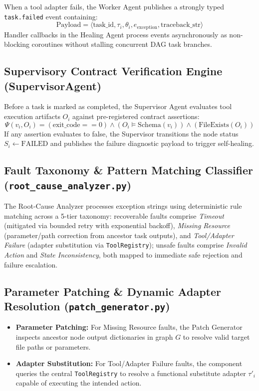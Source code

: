\documentclass[conference]{IEEEtran}
\newcommand{\chg}[1]{{\color{blue}#1}}
\begin{document}
When a tool adapter fails, the Worker Agent publishes a strongly typed \texttt{task.failed} event containing:
\begin{equation}
\text{Payload} = \langle \text{task\_id}, \tau_i, \theta_i, e_{\text{exception}}, \text{traceback\_str} \rangle
\end{equation}
Handler callbacks in the Healing Agent process events asynchronously as non-blocking coroutines without stalling concurrent DAG task branches.

\subsection{Supervisory Contract Verification Engine (SupervisorAgent)}
Before a task is marked as completed, the Supervisor Agent evaluates tool execution artifacts $O_i$ against pre-registered contract assertions:
\begin{equation}
\Psi(v_i, O_i) = (\text{exit\_code} == 0) \land (O_i \models \text{Schema}(v_i)) \land (\text{FileExists}(O_i))
\end{equation}
If any assertion evaluates to false, the Supervisor transitions the node status $S_i \leftarrow \text{FAILED}$ and publishes the failure diagnostic payload to trigger self-healing.

\subsection{Fault Taxonomy \& Pattern Matching Classifier (\texttt{root\_cause\_analyzer.py})}
\chg{The Root-Cause Analyzer processes exception strings using deterministic rule matching across a 5-tier taxonomy: recoverable faults comprise \textit{Timeout} (mitigated via bounded retry with exponential backoff), \textit{Missing Resource} (parameter/path correction from ancestor task outputs), and \textit{Tool/Adapter Failure} (adapter substitution via \texttt{ToolRegistry}); unsafe faults comprise \textit{Invalid Action} and \textit{State Inconsistency}, both mapped to immediate safe rejection and failure escalation.}

\subsection{Parameter Patching \& Dynamic Adapter Resolution (\texttt{patch\_generator.py})}
\begin{itemize}
    \item \textbf{Parameter Patching:} For Missing Resource faults, the Patch Generator inspects ancestor node output dictionaries in graph $G$ to resolve valid target file paths or parameters.
    \item \textbf{Adapter Substitution:} For Tool/Adapter Failure faults, the component queries the central \texttt{ToolRegistry} to resolve a functional substitute adapter $\tau'_i$ capable of executing the intended action.
\end{itemize}
\end{document}
